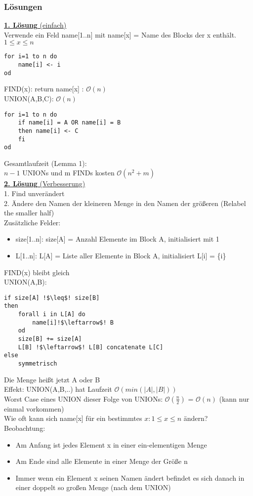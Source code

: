 \documentclass[a4paper]{article}
\newcommand{\oh}[1]{$\mathcal{O}(#1)$}
\begin{document}
\subsubsection*{Lösungen}
\underline{\textbf{1. Lösung} (einfach)}\\
Verwende ein Feld name[1..n] mit name[x] = Name des Blocks der x enthält. $1\leq x \leq n$\\
\begin{lstlisting}
for i=1 to n do
	name[i] <- i
od
\end{lstlisting}
FIND(x): return name[x] : \oh{n}\\
UNION(A,B,C): \oh{n}
\begin{lstlisting}
for i=1 to n do
	if name[i] = A OR name[i] = B
	then name[i] <- C
	fi
od
\end{lstlisting}
Gesamtlaufzeit (Lemma 1):\\
$n-1$ UNIONs und m FINDs kosten \oh{n^2+m}\\
\underline{\textbf{2. Lösung} (Verbesserung)}\\
1. Find unverändert\\
2. Ändere den Namen der kleineren Menge in den Namen der größeren (Relabel the smaller half)\\
Zusätzliche Felder:
\begin{itemize}
\item size[1..n]: size[A] = Anzahl Elemente im Block A, initialisiert mit 1
\item L[1..n]: L[A] = Liste aller Elemente in Block A, initialisiert L[i] = \{i\}
\end{itemize}
FIND(x) bleibt gleich\\
UNION(A,B):
\begin{lstlisting}[escapechar=!]
if size[A] !$\leq$! size[B]
then
	forall i in L[A] do
		name[i]!$\leftarrow$! B
	od
	size[B] += size[A]
	L[B] !$\leftarrow$! L[B] concatenate L[C]
else
	symmetrisch
\end{lstlisting}
Die Menge heißt jetzt A oder B\\
Effekt: UNION(A,B,..) hat Laufzeit \oh{min(|A|,|B|)}\\
Worst Case eines UNION dieser Folge von UNIONs: \oh{\frac{n}{2}} = \oh{n} (kann nur einmal vorkommen)\\
Wie oft kann sich name[x] für ein bestimmtes $x:1\leq x\leq n$ ändern?\\
Beobachtung:
\begin{itemize}
\item Am Anfang ist jedes Element x in einer ein-elementigen Menge
\item Am Ende sind alle Elemente in einer Menge der Größe n
\item Immer wenn ein Element x seinen Namen ändert befindet es sich danach in einer doppelt so großen Menge (nach dem UNION)
\end{itemize}
\end{document}
